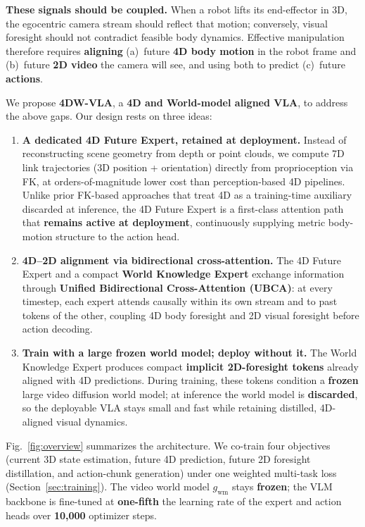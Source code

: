 \documentclass[journal]{IEEEtran}
\begin{document}
\textbf{These signals should be coupled.} When a robot lifts its
end-effector in 3D, the egocentric camera stream should reflect that
motion; conversely, visual foresight should not contradict feasible body
dynamics. Effective manipulation therefore requires \textbf{aligning}
(a)~future \textbf{4D body motion} in the robot frame and (b)~future
\textbf{2D video} the camera will see, and using both to predict
(c)~future \textbf{actions}.

We propose \textbf{4DW-VLA}, a \textbf{4D and World-model aligned VLA},
to address the above gaps. Our design rests on three ideas:
\begin{enumerate}
\item \textbf{A dedicated 4D Future Expert, retained at deployment.}
  Instead of reconstructing scene geometry from depth or point clouds, we
  compute 7D link trajectories (3D position + orientation) directly from
  proprioception via FK, at orders-of-magnitude lower cost than
  perception-based 4D pipelines. Unlike prior FK-based approaches that
  treat 4D as a training-time auxiliary discarded at inference, the 4D
  Future Expert is a first-class attention path that \textbf{remains
  active at deployment}, continuously supplying metric body-motion
  structure to the action head.
\item \textbf{4D--2D alignment via bidirectional cross-attention.} The 4D
  Future Expert and a compact \textbf{World Knowledge Expert} exchange
  information through \textbf{Unified Bidirectional Cross-Attention
  (UBCA)}: at every timestep, each expert attends causally within its own
  stream and to past tokens of the other, coupling 4D body foresight and
  2D visual foresight before action decoding.
\item \textbf{Train with a large frozen world model; deploy without it.}
  The World Knowledge Expert produces compact \textbf{implicit
  2D-foresight tokens} already aligned with 4D predictions. During
  training, these tokens condition a \textbf{frozen} large video diffusion
  world model; at inference the world model is \textbf{discarded}, so the
  deployable VLA stays small and fast while retaining distilled,
  4D-aligned visual dynamics.
\end{enumerate}

Fig.~\ref{fig:overview} summarizes the architecture. We co-train four
objectives (current 3D state estimation, future 4D prediction, future 2D
foresight distillation, and action-chunk generation) under one weighted
multi-task loss (Section~\ref{sec:training}). The video world model
$g_{\mathrm{wm}}$ stays \textbf{frozen}; the VLM backbone is fine-tuned
at \textbf{one-fifth} the learning rate of the expert and action heads
over \textbf{10{,}000} optimizer steps.
\end{document}
